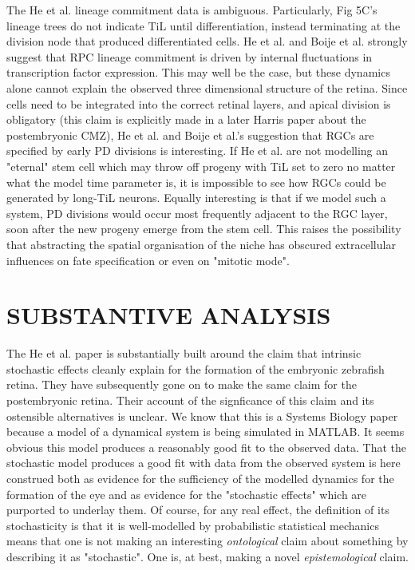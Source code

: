 The He et al. lineage commitment data is ambiguous. Particularly, Fig 5C's lineage trees do not indicate TiL until differentiation, instead terminating at the division node that produced differentiated cells. He et al. and Boije et al. strongly suggest that RPC lineage commitment is driven by internal fluctuations in transcription factor expression. This may well be the case, but these dynamics alone cannot explain the observed three dimensional structure of the retina. Since cells need to be integrated into the correct retinal layers, and apical division is obligatory (this claim is explicitly made in a later Harris paper about the postembryonic CMZ\cite{}), He et al. and Boije et al.'s suggestion that RGCs are specified by early PD divisions is interesting. If He et al. are not modelling an "eternal" stem cell which may throw off progeny with TiL set to zero no matter what the model time parameter is, it is impossible to see how RGCs could be generated by long-TiL neurons. Equally interesting is that if we model such a system, PD divisions would occur most frequently adjacent to the RGC layer, soon after the new progeny emerge from the stem cell. This raises the possibility that abstracting the spatial organisation of the niche has obscured extracellular influences on fate specification or even on "mitotic mode". 

\bigskip

\section{SUBSTANTIVE ANALYSIS}

The He et al. paper is substantially built around the claim that intrinsic stochastic effects cleanly explain for the formation of the embryonic zebrafish retina. They have subsequently gone on to make the same claim for the postembryonic retina. Their account of the signficance of this claim and its ostensible alternatives is unclear. We know that this is a Systems Biology paper because a model of a dynamical system is being simulated in MATLAB. It seems obvious this model produces a reasonably good fit to the observed data. That the stochastic model produces a good fit with data from the observed system is here construed both as evidence for the sufficiency of the modelled dynamics for the formation of the eye and as evidence for the "stochastic effects" which are purported to underlay them. Of course, for any real effect, the definition of its stochasticity is that it is well-modelled by probabilistic statistical mechanics means that one is not making an interesting \textit{ontological} claim about something by describing it as "stochastic". One is, at best, making a novel \textit{epistemological} claim.

